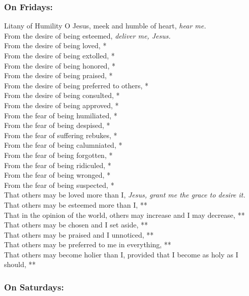 \documentclass{article}
\begin{document}
\begin{multicols}{3}
\begin{FlushLeft}
\subsubsection*{On Fridays:}
Litany of Humility
O Jesus, meek and humble of heart, \textit{hear me.}\\
From the desire of being esteemed, \textit{deliver me, Jesus.}\\
From the desire of being loved, *\\
From the desire of being extolled, *\\
From the desire of being honored, *\\
From the desire of being praised, *\\
From the desire of being preferred to others, *\\
From the desire of being consulted, *\\
From the desire of being approved, *\\
From the fear of being humiliated, *\\
From the fear of being despised, *\\
From the fear of suffering rebukes, *\\
From the fear of being calumniated, *\\
From the fear of being forgotten, *\\
From the fear of being ridiculed, *\\
From the fear of being wronged, *\\
From the fear of being suspected, *\\
That others may be loved more than I, \textit{Jesus, grant me the grace to desire it.}\\
That others may be esteemed more than I, **\\
That in the opinion of the world, others may increase and I may decrease, **\\
That others may be chosen and I set aside, **\\
That others may be praised and I unnoticed, **\\
That others may be preferred to me in everything, **\\
That others may become holier than I, provided that I become as holy as I should, **\\
\end{FlushLeft}


\subsubsection*{On Saturdays:}


\end{multicols}
\end{document}
